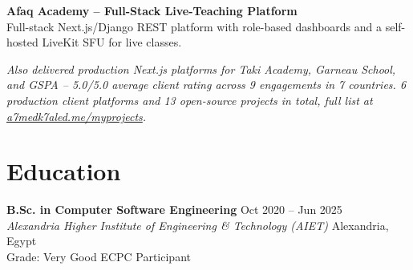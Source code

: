 \documentclass[10pt,letterpaper]{article}
\newcommand{\sectionrule}{\vspace{-1pt}{\color{hairline}\hrule height 0.6pt}\vspace{2pt}}
\newcommand{\entryHeading}[4]{%
  \textbf{#1} \hfill {\small\color{muted}#2}\\
  {\small\color{muted}\textit{#3}} \hfill {\small\color{muted}#4}\\[0pt]
}
\newcommand{\lineHeading}[2]{%
  \textbf{#1} \hfill {\small\color{muted}#2}\\[0pt]
}
\newcommand{\sectionNote}[1]{{\footnotesize\color{muted}\itshape#1}}
\begin{document}
\lineHeading{Afaq Academy -- Full-Stack Live-Teaching Platform}{}
{\small Full-stack Next.js/Django REST platform with role-based dashboards and a self-hosted LiveKit SFU for
live classes.}

\vspace{2pt}
\sectionNote{Also delivered production Next.js platforms for Taki Academy, Garneau School, and GSPA -- 5.0/5.0
average client rating across 9 engagements in 7 countries. 6 production client platforms and 13 open-source
projects in total, full list at \href{https://a7medk7aled.me/myprojects}{a7medk7aled.me/myprojects}.}

\section*{Education}
\sectionrule
\entryHeading{B.Sc. in Computer Software Engineering}{Oct 2020 -- Jun 2025}{Alexandria Higher Institute of Engineering \& Technology (AIET)}{Alexandria, Egypt}
{\small Grade: Very Good \quad\textperiodcentered\quad ECPC Participant}
\end{document}
